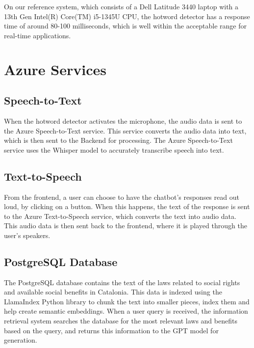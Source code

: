 \documentclass[a4paper,12pt,twoside]{ThesisStyle}
\begin{document}
On our reference system, which consists of a Dell Latitude 3440 laptop with a 13th Gen Intel(R) Core(TM) i5-1345U CPU, the hotword detector has a response time of around 80-100 milliseconds, which is well within the acceptable range for real-time applications.

\section{Azure Services}
\label{sec:azure_services}

\subsection{Speech-to-Text}
\label{subsec:speech_to_text}

When the hotword detector activates the microphone, the audio data is sent to the Azure Speech-to-Text service. This service converts the audio data into text, which is then sent to the Backend for processing. The Azure Speech-to-Text service uses the Whisper \cite{Radford2022RobustSpeechRecognitionLargeScale} model to accurately transcribe speech into text.

\subsection{Text-to-Speech}
\label{subsec:text_to_speech}

From the frontend, a user can choose to have the chatbot's responses read out loud, by clicking on a button. When this happens, the text of the response is sent to the Azure Text-to-Speech service, which converts the text into audio data. This audio data is then sent back to the frontend, where it is played through the user's speakers.

\subsection{PostgreSQL Database}
\label{subsec:database}

The PostgreSQL database contains the text of the laws related to social rights and available social benefits in Catalonia. This data is indexed using the LlamaIndex Python library to chunk the text into smaller pieces, index them and  help create semantic embeddings. When a user query is received, the information retrieval system searches the database for the most relevant laws and benefits based on the query, and returns this information to the GPT model for generation.
\end{document}
